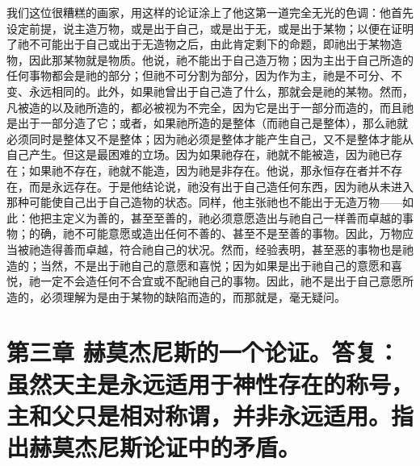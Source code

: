 我们这位很糟糕的画家，用这样的论证涂上了他这第一道完全无光的色调：他首先设定前提，说主造万物，或是出于自己，或是出于无，或是出于某物；以便在证明了祂不可能出于自己或出于无造物之后，由此肯定剩下的命题，即祂出于某物造物，因此那某物就是物质。他说，祂不能出于自己造万物；因为主出于自己所造的任何事物都会是祂的部分；但祂不可分割为部分，因为作为主，祂是不可分、不变、永远相同的。此外，如果祂曾出于自己造了什么，那就会是祂的某物。然而，凡被造的以及祂所造的，都必被视为不完全，因为它是出于一部分而造的，而且祂是出于一部分造了它；或者，如果祂所造的是整体（而祂自己是整体），那么祂就必须同时是整体又不是整体；因为祂必须是整体才能产生自己，又不是整体才能从自己产生。但这是最困难的立场。因为如果祂存在，祂就不能被造，因为祂已存在；如果祂不存在，祂就不能造，因为祂是非存在。他说，那永恒存在者并不存在，而是永远存在。于是他结论说，祂没有出于自己造任何东西，因为祂从未进入那种可能使自己出于自己造物的状态。同样，他主张祂也不能出于无造万物——如此：他把主定义为善的，甚至至善的，祂必须意愿造出与祂自己一样善而卓越的事物；的确，祂不可能意愿或造出任何不善的、甚至不是至善的事物。因此，万物应当被祂造得善而卓越，符合祂自己的状况。然而，经验表明，甚至恶的事物也是祂造的；当然，不是出于祂自己的意愿和喜悦；因为如果是出于祂自己的意愿和喜悦，祂一定不会造任何不合宜或不配祂自己的事物。因此，祂不是出于自己意愿所造的，必须理解为是由于某物的缺陷而造的，而那就是，毫无疑问。\par


\section{第三章 赫莫杰尼斯的一个论证。答复：虽然天主是永远适用于神性存在的称号，主和父只是相对称谓，并非永远适用。指出赫莫杰尼斯论证中的矛盾。}

